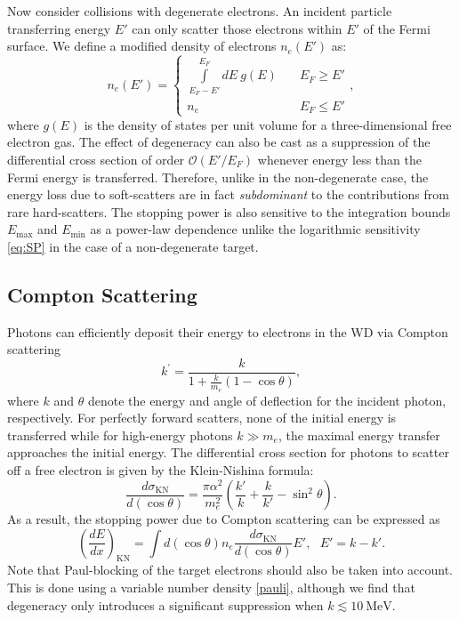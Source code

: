 \documentclass[twocolumn,showpacs,preprintnumbers,amsmath,amssymb,prd]{revtex4}
\def\r{\right)}
\def\l{\left(}
\begin{document}
\begin{appendices}
Now consider collisions with degenerate electrons. An incident particle transferring energy $E'$ can only scatter those electrons within $E'$ of the Fermi surface. We define a modified density of electrons $n_e(E')$ as:
\begin{equation}
\label{pauli}
n_e(E') = \left\{
        \begin{array}{ll}
            \displaystyle \int \limits_{E_F -E'}^{E_F}dE ~g(E) & \quad E_F \geq E' \\
            n_e & \quad E_F \leq E'
        \end{array}
    \right.,
\end{equation}
where $g(E)$ is the density of states per unit volume for a three-dimensional free electron gas. The effect of degeneracy can also be cast as a suppression of the differential cross section of order $\mathcal{O}(E'/E_F)$ whenever energy less than the Fermi energy is transferred. Therefore, unlike in the non-degenerate case, the energy loss due to soft-scatters are in fact \emph{subdominant} to the contributions from rare hard-scatters. The stopping power is also sensitive to the integration bounds $E_{\text{max}}$ and $E_{\text{min}}$ as a power-law dependence unlike the logarithmic sensitivity \eqref{eq:SP} in the case of a non-degenerate target.

\subsection*{Compton Scattering}
Photons can efficiently deposit their energy to electrons in the WD via Compton scattering
\begin{equation}
{k^{\prime }={\frac {k}{1+{\frac {k}{m_e}}(1-\cos \theta )}}},
\end{equation}
where $k$ and $\theta$ denote the energy and angle of deflection for the incident photon, respectively. For perfectly forward scatters, none of the initial energy is transferred while for high-energy photons $k \gg m_e$, the maximal energy transfer approaches the initial energy. The differential cross section for photons to scatter off a free electron is given by the Klein-Nishina formula:
\begin{equation}
\label{KN}
\frac{d\sigma_\text{KN}}{d (\cos \theta)}=\frac{\pi \alpha^2}{m_e^2} \l \frac{k'}{k} + \frac{k}{k'} -\sin^2 \theta \r.
\end{equation}
As a result, the stopping power due to Compton scattering can be expressed as
\begin{equation}
\label{eq:comptonSP}
\l \frac{dE}{dx}\r_\text{KN} =  \int d (\cos \theta) n_e \frac{d\sigma_\text{KN}}{d (\cos \theta)} E', ~~~ E' = k - k'.
\end{equation}
Note that Paul-blocking of the target electrons should also be taken into account. This is done using a variable number density \eqref{pauli}, although we find that degeneracy only introduces a significant suppression when $k\lesssim 10 ~\text{MeV}$.


\end{appendices}
\end{document}
